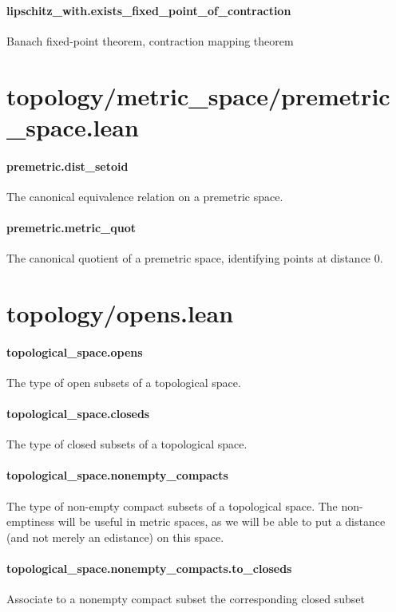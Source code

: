 \documentclass{article}
\begin{document}
\paragraph{lipschitz\_with.exists\_fixed\_point\_of\_contraction}
\par
Banach fixed-point theorem, contraction mapping theorem
\section{topology/metric\_space/premetric\_space.lean}\paragraph{premetric.dist\_setoid}
\par
The canonical equivalence relation on a premetric space.
\paragraph{premetric.metric\_quot}
\par
The canonical quotient of a premetric space, identifying points at distance 0.
\section{topology/opens.lean}\paragraph{topological\_space.opens}
\par
The type of open subsets of a topological space.
\paragraph{topological\_space.closeds}
\par
The type of closed subsets of a topological space.
\paragraph{topological\_space.nonempty\_compacts}
\par
The type of non-empty compact subsets of a topological space. The
non-emptiness will be useful in metric spaces, as we will be able to put
a distance (and not merely an edistance) on this space.
\paragraph{topological\_space.nonempty\_compacts.to\_closeds}
\par
Associate to a nonempty compact subset the corresponding closed subset
\end{document}
